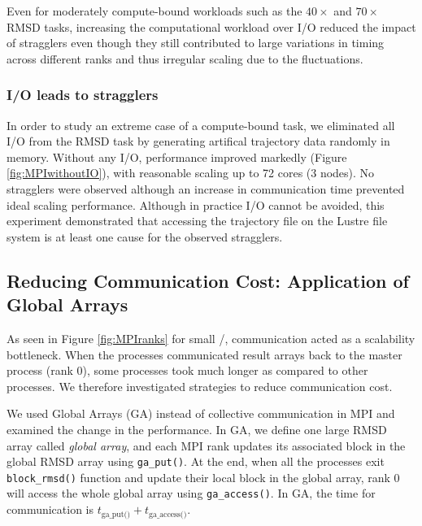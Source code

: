 Even for moderately compute-bound workloads such as the $40\times$ and $70\times$ RMSD tasks, increasing the computational workload over I/O reduced the impact of stragglers even though they still contributed to large variations in timing across different ranks and thus irregular scaling due to the fluctuations.

\subsubsection{I/O leads to stragglers}

In order to study an extreme case of a compute-bound task, we eliminated all I/O from the RMSD task by generating artifical trajectory data randomly in memory.
Without any I/O, performance improved markedly (Figure \ref{fig:MPIwithoutIO}), with reasonable scaling up to 72 cores (3 nodes).
No stragglers were observed although an increase in communication time prevented ideal scaling performance.
Although in practice I/O cannot be avoided, this experiment demonstrated that accessing the trajectory file on the Lustre file system is at least one cause for the observed stragglers.


\subsection{Reducing Communication Cost: Application of Global Arrays}
\label{Global-Array}
As seen in Figure \ref{fig:MPIranks} for small \tcomp/\tIO, communication acted as a scalability bottleneck. 
When the processes communicated result arrays back to the master process (rank 0), some processes took much longer as compared to other processes. 
We therefore investigated strategies to reduce communication cost. 

We used Global Arrays (GA) \cite{GA, GAiN} instead of collective communication in MPI and examined the change in the performance. 
In GA, we define one large RMSD array called \emph{global array}, and each MPI rank updates its associated block in the global RMSD array using \texttt{ga\_put()}. 
At the end, when all the processes exit \texttt{block\_rmsd()} function and update their local block in the global array, rank 0 will access the whole global array using \texttt{ga\_access()}.
In GA, the time for communication is $t_{\text{ga\_put()}}+t_{\text{ga\_access()}}$. 

